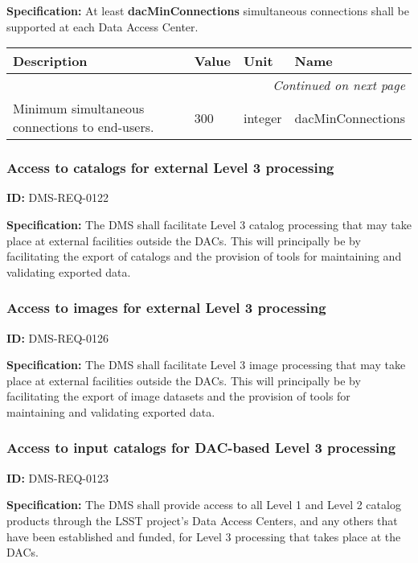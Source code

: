 \documentclass[SE,toc,lsstdraft]{lsstdoc}
\makeatletter
\newcommand{\paramname}[1]{\hspace{0pt}#1}
\newcommand{\unitname}[1]{\hspace{0pt}#1}
\newenvironment{parameters}[0]{%
\setlength\LTleft{0pt}
\setlength\LTright{\fill}
\begin{small}
\begin{longtable}[]{|p{0.5\textwidth}|l|p{0.6in}|p{1.74in}@{}|}

\hline \textbf{Description} & \textbf{Value} & \textbf{Unit} & \textbf{Name} \\ \hline
\endhead

\hline \multicolumn{4}{r}{\emph{Continued on next page}} \\
\endfoot

\hline\hline
\endlastfoot
}{%
\hline
\end{longtable}
\end{small}
}
\makeatother
\begin{document}
\textbf{Specification:} At least \textbf{dacMinConnections }simultaneous connections shall be supported at each Data Access Center.





\begin{parameters}
Minimum simultaneous connections to end-users.
&
300
&
\unitname{%
integer
}
&
\paramname{%
dacMinConnections
} \\\hline
\end{parameters}




\subsubsection{Access to catalogs for external Level 3 processing}

\label{DMS-REQ-0122}
\textbf{ID:} DMS-REQ-0122

\textbf{Specification: }The DMS shall facilitate Level 3 catalog processing that may take place at external facilities outside the DACs.  This will principally be by facilitating the export of catalogs and the provision of tools for maintaining and validating exported data.






\subsubsection{Access to images for external Level 3 processing}

\label{DMS-REQ-0126}
\textbf{ID:} DMS-REQ-0126

\textbf{Specification: }The DMS shall facilitate Level 3 image processing that may take place at external facilities outside the DACs.  This will principally be by facilitating the export of image datasets and the provision of tools for maintaining and validating exported data.






\subsubsection{Access to input catalogs for DAC-based Level 3 processing}

\label{DMS-REQ-0123}
\textbf{ID:} DMS-REQ-0123

\textbf{Specification: }The DMS shall provide access to all Level 1 and Level 2 catalog products through the LSST project's Data Access Centers, and any others that have been established and funded, for Level 3 processing that takes place at the DACs.
\end{document}
